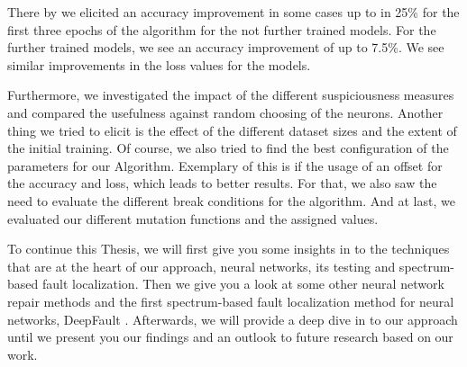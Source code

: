 There by we elicited an accuracy improvement in some cases up to in 25\% for the first three epochs of the algorithm for the not further trained models.
For the further trained models, we see an accuracy improvement of up to 7.5\%.
We see similar improvements in the loss values for the models.

Furthermore, we investigated the impact of the different suspiciousness measures and compared the usefulness against random choosing of the neurons.
Another thing we tried to elicit is the effect of the different dataset sizes and the extent of the initial training.
Of course, we also tried to find the best configuration of the parameters for our Algorithm.
Exemplary of this is if the usage of an offset for the accuracy and loss, which leads to better results.
For that, we also saw the need to evaluate the different break conditions for the algorithm.
And at last, we evaluated our different mutation functions and the assigned values.

To continue this Thesis, we will first give you some insights in to the techniques that are at the heart of our approach, neural networks, its testing and spectrum-based fault localization.
Then we give you a look at some other neural network repair methods and the first spectrum-based fault localization method for neural networks, DeepFault  \cite{eniser_deepfault_2019}.
Afterwards, we will provide a deep dive in to our approach until we present you our findings and an outlook to future research based on our work.